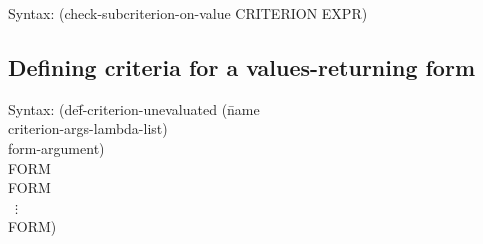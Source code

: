 {\ttfamily\begin{tabbing}
\textrm{Syntax: }(check-subcriterion-on-value CRITERION EXPR)
\end{tabbing}}
% 

\subsection{Defining criteria for a values-returning form}
\label{sec:def-criterion-unevaluated}
{\ttfamily\begin{tabbing}
\textrm{Syntax: }(de\=f-criterion-unevaluated (\=name
\\ \>            \>criterion-args-lambda-list)
\\ \>            \>form-argument)
\\ \> FORM
\\ \> FORM
\\ \> ~$\vdots$
\\ \> FORM)
\end{tabbing}}
